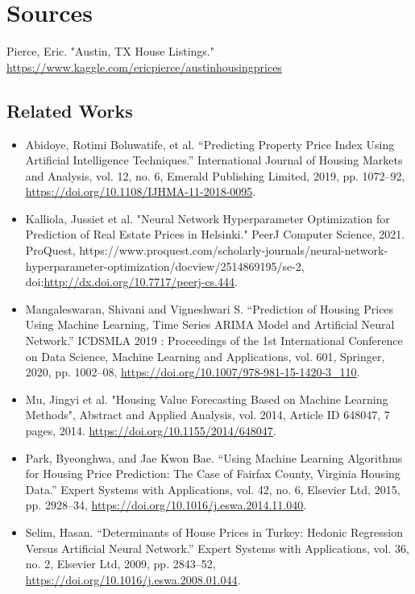 \documentclass[12pt]{article}
\begin{document}
	\section{Sources}
	
	Pierce, Eric. "Austin, TX House Listings." \url{https://www.kaggle.com/ericpierce/austinhousingprices}
	
	\subsection{Related Works}
	
	\begin{itemize}
		\item Abidoye, Rotimi Boluwatife, et al. “Predicting Property Price Index Using Artificial Intelligence Techniques.” International Journal of Housing Markets and Analysis, vol. 12, no. 6, Emerald Publishing Limited, 2019, pp. 1072–92, \url{https://doi.org/10.1108/IJHMA-11-2018-0095}.
		
		\item Kalliola, Jussiet et al. "Neural Network Hyperparameter Optimization for Prediction of Real Estate Prices in Helsinki." PeerJ Computer Science, 2021. ProQuest, https://www.proquest.com/scholarly-journals/neural-network-hyperparameter-optimization/docview/2514869195/se-2, doi:\url{http://dx.doi.org/10.7717/peerj-cs.444}.
		
		\item Mangaleswaran, Shivani and Vigneshwari S. “Prediction of Housing Prices Using Machine Learning, Time Series ARIMA Model and Artificial Neural Network.” ICDSMLA 2019 : Proceedings of the 1st International Conference on Data Science, Machine Learning and Applications, vol. 601, Springer, 2020, pp. 1002–08, \url{https://doi.org/10.1007/978-981-15-1420-3_110}.	
			
		\item Mu, Jingyi et al. "Housing Value Forecasting Based on Machine Learning Methods", Abstract and Applied Analysis, vol. 2014, Article ID 648047, 7 pages, 2014. \url{https://doi.org/10.1155/2014/648047}.
		
		\item Park, Byeonghwa, and Jae Kwon Bae. “Using Machine Learning Algorithms for Housing Price Prediction: The Case of Fairfax County, Virginia Housing Data.” Expert Systems with Applications, vol. 42, no. 6, Elsevier Ltd, 2015, pp. 2928–34, \url{https://doi.org/10.1016/j.eswa.2014.11.040}.
		
		\item Selim, Hasan. “Determinants of House Prices in Turkey: Hedonic Regression Versus Artificial Neural Network.” Expert Systems with Applications, vol. 36, no. 2, Elsevier Ltd, 2009, pp. 2843–52, \url{https://doi.org/10.1016/j.eswa.2008.01.044}.
	\end{itemize}
\end{document}
